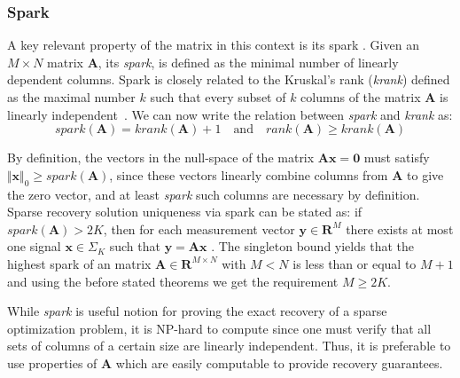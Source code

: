 \documentclass[journal]{IEEEtran}
\begin{document}
\subsubsection{Spark}
A key relevant property of the matrix in this context is its spark \cite{donoho2003optimally}. Given an $M\times N$ matrix $\boldsymbol{A}$, its \textit{spark}, is defined as the minimal number of linearly dependent columns. Spark is closely related to the Kruskal's rank (\textit{krank}) defined as the maximal number $k$ such that every subset of $k$ columns of the matrix $\boldsymbol{A}$ is linearly independent~\cite{kruskal1977three}. We can now write the relation between \textit{spark} and \textit{krank} as:
%
\begin{equation} \label{eq:skrank}
	spark(\boldsymbol{A})=krank(\boldsymbol{A})+1\quad \text{and} \quad rank(\boldsymbol{A})\geq krank(\boldsymbol{A})
\end{equation}

By definition, the vectors in the null-space of the matrix $\boldsymbol{A}\boldsymbol{x}=\boldsymbol{0}$ must satisfy $\Vert \boldsymbol{x}\Vert_0\geq spark(\boldsymbol{A})$, since these vectors linearly combine columns from $\boldsymbol{A}$ to give the zero vector, and at least \textit{spark} such columns are necessary by definition. Sparse recovery solution uniqueness via spark can be stated as: if $spark(\boldsymbol{A})>2K$, then for each measurement vector $\boldsymbol{y}\in\mathbf{R}^M$ there exists at most one signal $\boldsymbol{x}\in\Sigma_K$ such that $\boldsymbol{y}=\boldsymbol{A}\boldsymbol{x}$ \cite{Rish2015}. The singleton bound yields that the highest spark of an matrix $\boldsymbol{A}\in\mathbf{R}^{M\times N}$ with $M<N$ is less than or equal to $M+1$ and using the before stated theorems we get the requirement $M\geq 2K$.

While \textit{spark} is useful notion for proving the exact recovery of a sparse optimization problem, it is NP-hard to compute since one must verify that all sets of columns of a certain size are linearly independent. Thus, it is preferable to use properties of $\boldsymbol{A}$ which are easily computable to provide recovery guarantees.
\end{document}
